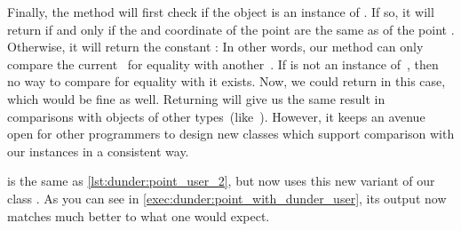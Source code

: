 Finally, the  method will first check if the  object is an instance of .
If so, it will return  if and only if the  and  coordinate of the  point are the same as of the point .
Otherwise, it will return the constant :%
%
%
%
In other words, our  method can only compare the current~ for equality with another~.
If  is not an instance of~, then no way to compare for equality with it exists.
Now, we could return  in this case, which would be fine as well.
Returning  will give us the same result in comparisons with objects of other types~(like~).
However, it keeps an avenue open for other programmers to design new classes which support comparison with our  instances in a consistent way.

 is the same as \cref{lst:dunder:point_user_2}, but now uses this new variant of our class .
As you can see in \cref{exec:dunder:point_with_dunder_user}, its output now matches much better to what one would expect.%
\endhsection%
%
\endhsection%
